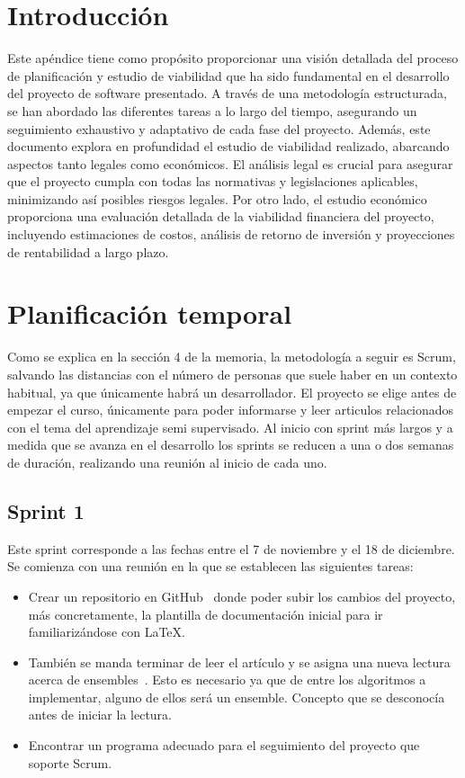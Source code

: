 
\section{Introducción}
Este apéndice tiene como propósito proporcionar una visión detallada del proceso de planificación y estudio de viabilidad que ha sido fundamental en el desarrollo del proyecto de software presentado. A través de una metodología estructurada, se han abordado las diferentes tareas a lo largo del tiempo, asegurando un seguimiento exhaustivo y adaptativo de cada fase del proyecto.
Además, este documento explora en profundidad el estudio de viabilidad realizado, abarcando aspectos tanto legales como económicos. El análisis legal es crucial para asegurar que el proyecto cumpla con todas las normativas y legislaciones aplicables, minimizando así posibles riesgos legales. Por otro lado, el estudio económico proporciona una evaluación detallada de la viabilidad financiera del proyecto, incluyendo estimaciones de costos, análisis de retorno de inversión y proyecciones de rentabilidad a largo plazo.

\section{Planificación temporal}
Como se explica en la sección 4 de la memoria, la metodología a seguir es Scrum, salvando las distancias con el número de personas que suele haber en un contexto habitual, ya que únicamente habrá un desarrollador.
El proyecto se elige antes de empezar el curso, únicamente para poder informarse y leer articulos relacionados con el tema del aprendizaje semi supervisado. Al inicio con sprint más largos y a medida que se avanza en el desarrollo los sprints se reducen a una o dos semanas de duración, realizando una reunión al inicio de cada uno.


\subsection{Sprint 1}
Este sprint corresponde a las fechas entre el 7 de noviembre y el 18 de diciembre. Se comienza con una reunión en la que se establecen las siguientes tareas:\\
\begin{itemize}
	\item Crear un repositorio en GitHub~\cite{Repo:Github} donde poder subir los cambios del proyecto, más concretamente, la plantilla de documentación inicial para ir familiarizándose con \LaTeX.
	\item También se manda terminar de leer el artículo \cite{Engelen:semi-supervised} y se asigna una nueva lectura acerca de ensembles~\cite{ensembles}. Esto es necesario ya que de entre los algoritmos a implementar, alguno de ellos será un ensemble. Concepto que se desconocía antes de iniciar la lectura.
	\item Encontrar un programa adecuado para el seguimiento del proyecto que soporte Scrum.
\end{itemize}

